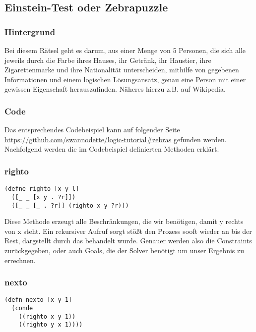 \subsection{Einstein-Test oder Zebrapuzzle}

\subsubsection{Hintergrund}

Bei diesem Rätsel geht es darum, aus einer Menge von 5 Personen, die sich alle jeweils durch die Farbe ihres Hauses, ihr Getränk, ihr Haustier, ihre Zigarettenmarke und ihre Nationalität unterscheiden, mithilfe von gegebenen Informationen und einem logischen Lösungsansatz, genau eine Person mit einer gewissen Eigenschaft herauszufinden. Näheres hierzu z.B. auf Wikipedia.

\subsubsection{Code}

Das entsprechendes Codebeispiel kann auf folgender Seite \url{https://github.com/swannodette/logic-tutorial#zebras} gefunden werden. 
Nachfolgend werden die im Codebeispiel definierten Methoden erklärt.

\subsubsection{righto}

\begin{lstlisting}
(defne righto [x y l]
  ([_ _ [x y . ?r]])
  ([_ _ [_ . ?r]] (righto x y ?r)))
\end{lstlisting}

Diese Methode erzeugt alle Beschränkungen, die wir benötigen, damit \dq{}y\dq{} rechts von \dq{}x\dq{} steht. Ein rekursiver Aufruf sorgt stößt den Prozess sooft wieder an bis der Rest, dargstellt durch das  behandelt wurde. Genauer werden also die Constraints zurückgegeben, oder auch Goals, die der Solver benötigt um unser Ergebnis zu errechnen.

\subsubsection{nexto}

\begin{lstlisting}
(defn nexto [x y 1]
  (conde
    ((righto x y 1))
    ((righto y x 1))))
\end{lstlisting}

